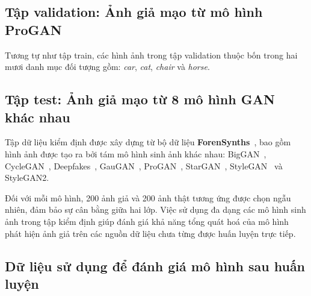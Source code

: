 \subsection{Tập \gls{validation}:  Ảnh giả mạo từ mô hình ProGAN}
Tương tự như tập \gls{train}, các hình ảnh trong tập \gls{validation} thuộc bốn trong hai mươi danh mục đối tượng gồm: \textit{car}, \textit{cat}, \textit{chair} và \textit{horse}.
%


\subsection{Tập \gls{test}: Ảnh giả mạo từ 8 mô hình GAN khác nhau}
%
\label{ssec:tap_kiem_dinh}
%
Tập dữ liệu kiểm định được xây dựng từ bộ dữ liệu \textbf{ForenSynths}~\cite{Wang2019CNNGeneratedIA}, bao gồm hình ảnh được tạo ra bởi tám mô hình sinh ảnh khác nhau: BigGAN~\cite{brock2018large}, CycleGAN~\cite{zhu2017unpaired}, Deepfakes~\cite{CaliforniaDeepfakes}, GauGAN~\cite{park2019SPADE}, ProGAN~\cite{karras2018progressive}, StarGAN~\cite{choi2018stargan}, StyleGAN~\cite{karras2019style} và StyleGAN2\cite{Karras2019AnalyzingAI}.  

Đối với mỗi mô hình, 200 ảnh giả và 200 ảnh thật tương ứng được chọn ngẫu nhiên, đảm bảo sự cân bằng giữa hai lớp. Việc sử dụng đa dạng các mô hình sinh ảnh trong tập kiểm định giúp đánh giá khả năng tổng quát hoá của mô hình phát hiện ảnh giả trên các nguồn dữ liệu chưa từng được huấn luyện trực tiếp.

\subsection{Dữ liệu sử dụng để đánh giá mô hình sau huấn luyện}

